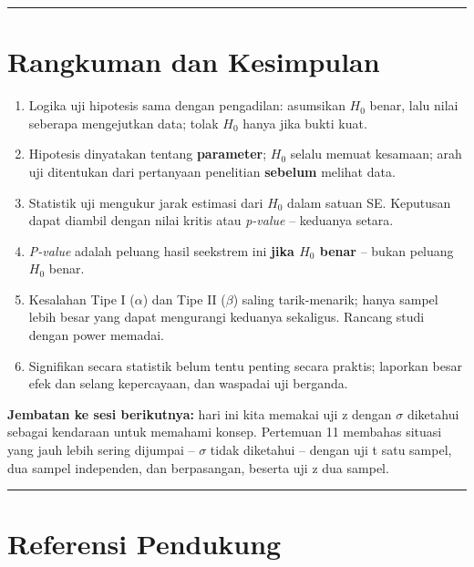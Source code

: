 \documentclass[
  indonesian,
  letterpaper,
]{book}
\providecommand{\tightlist}{%
  \setlength{\itemsep}{0pt}\setlength{\parskip}{0pt}}
\begin{document}
\begin{center}\rule{0.5\linewidth}{0.5pt}\end{center}

\section{Rangkuman dan Kesimpulan}\label{rangkuman-dan-kesimpulan-1}

\begin{enumerate}
\def\labelenumi{\arabic{enumi}.}
\tightlist
\item
  Logika uji hipotesis sama dengan pengadilan: asumsikan \(H_0\) benar,
  lalu nilai seberapa mengejutkan data; tolak \(H_0\) hanya jika bukti
  kuat.
\item
  Hipotesis dinyatakan tentang \textbf{parameter}; \(H_0\) selalu memuat
  kesamaan; arah uji ditentukan dari pertanyaan penelitian
  \textbf{sebelum} melihat data.
\item
  Statistik uji mengukur jarak estimasi dari \(H_0\) dalam satuan SE.
  Keputusan dapat diambil dengan nilai kritis atau \emph{p-value} --
  keduanya setara.
\item
  \emph{P-value} adalah peluang hasil seekstrem ini \textbf{jika \(H_0\)
  benar} -- bukan peluang \(H_0\) benar.
\item
  Kesalahan Tipe I (\(\alpha\)) dan Tipe II (\(\beta\)) saling
  tarik-menarik; hanya sampel lebih besar yang dapat mengurangi keduanya
  sekaligus. Rancang studi dengan power memadai.
\item
  Signifikan secara statistik belum tentu penting secara praktis;
  laporkan besar efek dan selang kepercayaan, dan waspadai uji berganda.
\end{enumerate}

\textbf{Jembatan ke sesi berikutnya:} hari ini kita memakai uji z dengan
\(\sigma\) diketahui sebagai kendaraan untuk memahami konsep. Pertemuan
11 membahas situasi yang jauh lebih sering dijumpai -- \(\sigma\) tidak
diketahui -- dengan uji t satu sampel, dua sampel independen, dan
berpasangan, beserta uji z dua sampel.

\begin{center}\rule{0.5\linewidth}{0.5pt}\end{center}

\section{Referensi Pendukung}\label{referensi-pendukung-1}
\end{document}
